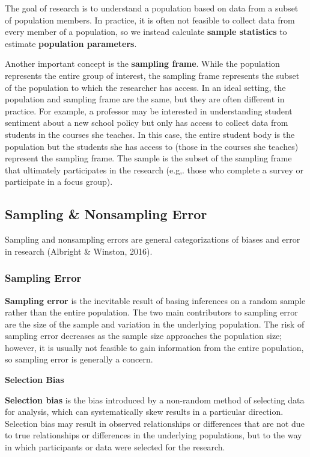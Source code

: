 \documentclass[]{book}
\begin{document}
The goal of research is to understand a population based on data from a subset of population members. In practice, it is often not feasible to collect data from every member of a population, so we instead calculate \textbf{sample statistics} to estimate \textbf{population parameters}.

Another important concept is the \textbf{sampling frame}. While the population represents the entire group of interest, the sampling frame represents the subset of the population to which the researcher has access. In an ideal setting, the population and sampling frame are the same, but they are often different in practice. For example, a professor may be interested in understanding student sentiment about a new school policy but only has access to collect data from students in the courses she teaches. In this case, the entire student body is the population but the students she has access to (those in the courses she teaches) represent the sampling frame. The sample is the subset of the sampling frame that ultimately participates in the research (e.g,. those who complete a survey or participate in a focus group).

\hypertarget{sampling-nonsampling-error}{%
\subsection{Sampling \& Nonsampling Error}\label{sampling-nonsampling-error}}

Sampling and nonsampling errors are general categorizations of biases and error in research (Albright \& Winston, 2016).

\hypertarget{sampling-error}{%
\subsubsection{Sampling Error}\label{sampling-error}}

\textbf{Sampling error} is the inevitable result of basing inferences on a random sample rather than the entire population. The two main contributors to sampling error are the size of the sample and variation in the underlying population. The risk of sampling error decreases as the sample size approaches the population size; however, it is usually not feasible to gain information from the entire population, so sampling error is generally a concern.

\textbf{Selection Bias}

\textbf{Selection bias} is the bias introduced by a non-random method of selecting data for analysis, which can systematically skew results in a particular direction. Selection bias may result in observed relationships or differences that are not due to true relationships or differences in the underlying populations, but to the way in which participants or data were selected for the research.
\end{document}
